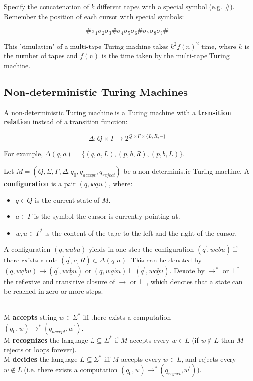\documentclass[12pt]{article}
\begin{document}
\noindent
Specify the concatenation of $k$ different tapes with a special symbol (e.g. $\#$).
Remember the position of each cursor with special symbols:

\[ \# \sigma_1 \overline{\sigma_2} \sigma_3 \# \sigma_4 \overline{\sigma_5} \sigma_6 \# \sigma_7 \overline{\sigma_8} \sigma_9 \# \]

\noindent
This 'simulation' of a multi-tape Turing machine takes $k^2 f(n)^2$ time, where $k$ is the number of tapes and $f(n)$ is the time taken by the multi-tape Turing machine.

\subsection*{Non-deterministic Turing Machines}
A non-deterministic Turing machine is a Turing machine with a \textbf{transition relation} instead of a transition function:

\[ \Delta: Q \times \Gamma \rightarrow 2^{Q \times \Gamma \times \{L, R, -\}} \]

\noindent
For example, $\Delta(q, a) = \{(q, a, L), (p, b, R), (p, b, L)\}$.

\newpage
\noindent
Let $M = (Q, \Sigma, \Gamma, \Delta, q_0, q_{accept}, q_{reject})$ be a non-deterministic Turing machine.
A \textbf{configuration} is a pair $(q, w\underline{a}u)$, where:

\begin{itemize}
    \item $q \in Q$ is the current state of $M$.
    \item $a \in \Gamma$ is the symbol the cursor is currently pointing at.
    \item $w, u \in \Gamma^*$ is the content of the tape to the left and the right of the cursor.
\end{itemize}

\noindent
A configuration $(q, w\underline{a}bu)$ yields in one step the configuration $(q^\prime, wc\underline{b}u)$ if there exists a rule $(q^\prime, c, R) \in \Delta(q, a)$.
This can be denoted by $(q, w\underline{a}bu) \rightarrow (q^\prime, wc\underline{b}u)$ or $(q, w\underline{a}bu) \vdash (q^\prime, wc\underline{b}u)$.
Denote by $\rightarrow^*$ or $\vdash^*$ the reflexive and transitive closure of $\rightarrow$ or $\vdash$, which denotes that a state can be reached in zero or more steps.

\noindent
\\
M \textbf{accepts} string $w \in \Sigma^*$ iff there exists a computation $(q_0, w) \rightarrow^* (q_{accept}, w^\prime)$.\\
M \textbf{recognizes} the language $L \subseteq \Sigma^*$ if $M$ accepts every $w \in L$ (if $w \notin L$ then $M$ rejects or loops forever).\\
M \textbf{decides} the language $L \subseteq \Sigma^*$ iff $M$ accepts every $w \in L$, and rejects every $w \notin L$ (i.e. there exists a computation $(q_0, w) \rightarrow^* (q_{reject}, w^\prime)$).
\end{document}
